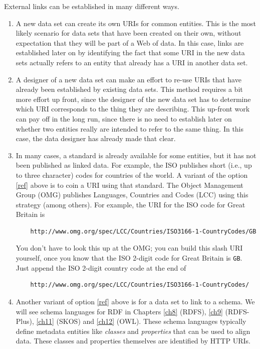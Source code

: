 External links can be established in many different ways.
\begin{enumerate}
    \item A new data set can create its own URIs for common entities.  This is 
    the most likely scenario for data sets that have been created on their own, without
    expectation that they will be part of a Web of data.  In this case, links
    are established later on by identifying the fact that some URI in the new data sets
    actually refers to an entity that already has a URI in another data set.  
    
    \item{A designer of a new data set can make an effort to re-use URIs that have already been established by 
    existing data sets.  This method requires a bit more effort up front, since the designer of the new 
    data set has to determine which URI corresponds to the thing they are describing. This up-front 
    work can pay off in the long run,  since
    there is no need to establish later on whether two entities really are intended to refer to the same thing. 
    In this case, the data designer has already made that clear.  
    \label{ref}
    }
    
    \item In many cases, a standard is already available for some entities, but it has not been published as 
    linked data.  For example, the ISO publishes short (i.e., up to three character) codes for countries of the world. 
    A variant of the  option \ref{ref} above is to coin a URI using that standard.  The Object Management Group (OMG) publishes Languages, Countries and Codes (LCC) using this strategy (among others).  For example, the URI for the ISO code for Great Britain is 
    \begin{lstlisting}
    http://www.omg.org/spec/LCC/Countries/ISO3166-1-CountryCodes/GB
    \end{lstlisting}
    You don't have to look this up 
    at the OMG; you can build this slash URI yourself, once you know that the ISO 2-digit code for Great Britain is \texttt{GB}. Just append the ISO 2-digit country code at the end of 
    \begin{lstlisting}
    http://www.omg.org/spec/LCC/Countries/ISO3166-1-CountryCodes/
    \end{lstlisting}
    
    \item Another variant of option \ref{ref} above is for a data set to link to a schema.  We will see schema languages for RDF in Chapters \ref{ch8} (RDFS), \ref{ch9} (RDFS-Plus), \ref{ch11} (SKOS) and \ref{ch12} (OWL).  These schema languages typically define metadata entities like \emph{classes} and \emph{properties} that can be used to align data.  These classes and properties themselves are identified by HTTP URIs.   \label{schem}
\end{enumerate}

